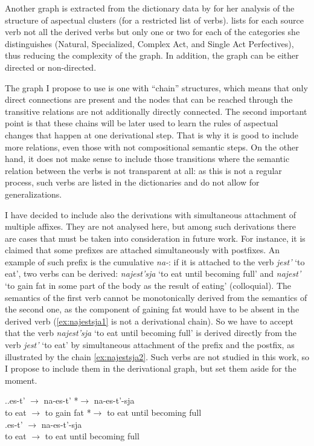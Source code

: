 Another graph is extracted from the dictionary data by \citet{Janda:07a} for her analysis of the structure of aspectual clusters (for a restricted list of verbs). \citeauthor{Janda:07a} lists for each source verb not all the derived verbs but only one or two for each of the categories she distinguishes (Natural, Specialized, Complex Act, and Single Act Perfectives), thus reducing the complexity of the graph. In addition, the graph can be either directed or non-directed. 
 
The graph I propose to use is one with ``chain'' structures, which means that only direct connections are present and the nodes that can be reached through the transitive relations are not additionally directly connected. The second important point is that these chains will be later used to learn the rules of aspectual changes that happen at one derivational step. That is why it is good to include more relations, even those with not compositional semantic steps. On the other hand, it does not make sense to include those transitions where the semantic relation between the verbs is not transparent at all: as this is not a regular process, such verbs are listed in the dictionaries and do not allow for generalizations. 

I have decided to include also the derivations with simultaneous attachment of multiple affixes. They are not analysed here, but among such derivations there are cases that must be taken into consideration in future work. For instance, it is claimed that some prefixes are attached simultaneously with postfixes. An example of such prefix is the cumulative \textit{na-}: if it is attached to the verb \textit{jest'} `to eat', two verbs can be derived: \textit{najest'sja} `to eat until becoming full' and \textit{najest'} `to gain fat in some part of the body as the result of eating' (colloquial). The semantics of the first verb cannot be  monotonically derived from the semantics of the second one, as the component of gaining fat would have to be absent in the derived verb (\ref{ex:najestsja1} is not a derivational chain). So we have to accept that the verb \textit{najest'sja} `to eat until becoming full' is derived directly from the verb \textit{jest'} `to eat' by simultaneous attachment of the prefix and the postfix, as illustrated by the chain \ref{ex:najestsja2}. Such verbs are not studied in this work, so I propose to include them in the derivational graph, but set them aside for the moment.
 
 \ex.\label{ex:najestsja}\ag.\label{ex:najestsja1}es-t'\textsuperscript{\IPF} $\rightarrow$ na-es-t'\textsuperscript{\PF} *$\rightarrow$ na-es-t'-sja\textsuperscript{\PF}\\	
{to eat} $\rightarrow$ {to gain fat} *$\rightarrow$ {to eat until becoming full}\\
\bg.\label{ex:najestsja2}es-t'\textsuperscript{\PF} $\rightarrow$ na-es-t'-sja\textsuperscript{\PF}\\
{to eat} $\rightarrow$ {to eat until becoming full}\\

